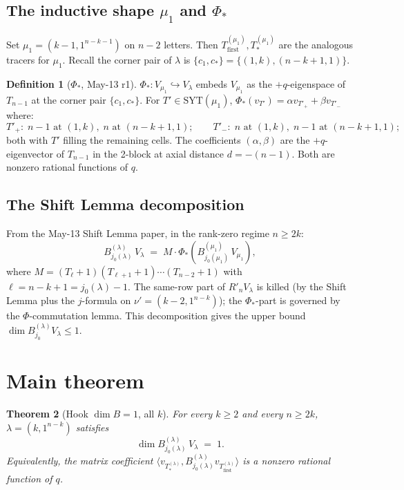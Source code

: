 \documentclass[11pt]{article}
\newtheorem{theorem}{Theorem}
\theoremstyle{definition}
\newtheorem{definition}[theorem]{Definition}
\begin{document}
\subsection{The inductive shape $\mu_1$ and $\Phi_*$}

Set $\mu_1 = (k-1, 1^{n-k-1})$ on $n-2$ letters.  Then
$T_{\mathrm{first}}^{(\mu_1)}, T_{*}^{(\mu_1)}$ are the analogous tracers
for $\mu_1$.  Recall the corner pair of $\lambda$ is
$\{c_1, c_*\} = \{(1, k), (n-k+1, 1)\}$.

\begin{definition}[$\Phi_*$, May-13 r1]\label{def:phi}
$\Phi_* : V_{\mu_1} \hookrightarrow V_\lambda$ embeds $V_{\mu_1}$ as the
$+q$-eigenspace of $T_{n-1}$ at the corner pair $\{c_1, c_*\}$.  For
$T' \in \mathrm{SYT}(\mu_1)$, $\Phi_*(v_{T'}) = \alpha v_{T'_+} + \beta v_{T'_-}$
where:
\[
    T'_+ : \; n{-}1 \text{ at } (1,k), \; n \text{ at } (n{-}k{+}1, 1);
    \qquad
    T'_- : \; n \text{ at } (1,k), \; n{-}1 \text{ at } (n{-}k{+}1, 1);
\]
both with $T'$ filling the remaining cells.  The coefficients
$(\alpha, \beta)$ are the $+q$-eigenvector of $T_{n-1}$ in the 2-block
at axial distance $d = -(n-1)$.  Both are nonzero rational functions
of $q$.
\end{definition}

\subsection{The Shift Lemma decomposition}

From the May-13 Shift Lemma paper, in the rank-zero regime $n \ge 2k$:
\begin{equation}\label{eq:shift-decomp}
    B^{(\lambda)}_{j_0(\lambda)}\,V_\lambda
    \;=\;
    M \cdot \Phi_*\!\left(B^{(\mu_1)}_{j_0(\mu_1)}\,V_{\mu_1}\right),
\end{equation}
where $M = (T_\ell{+}1)(T_{\ell+1}{+}1)\cdots(T_{n-2}{+}1)$ with
$\ell = n-k+1 = j_0(\lambda) - 1$.  The same-row part of
$R'_n V_\lambda$ is killed (by the Shift Lemma plus the $j$-formula on
$\nu' = (k-2, 1^{n-k})$); the $\Phi_*$-part is governed by the
$\Phi$-commutation lemma.  This decomposition gives the upper bound
$\dim B^{(\lambda)}_{j_0} V_\lambda \le 1$.

\section{Main theorem}\label{sec:main}

\begin{theorem}[Hook $\dim B = 1$, all $k$]\label{thm:main}
For every $k \ge 2$ and every $n \ge 2k$, $\lambda = (k, 1^{n-k})$
satisfies
\[
    \dim B^{(\lambda)}_{j_0(\lambda)}\,V_\lambda \;=\; 1.
\]
Equivalently, the matrix coefficient
$\langle v_{T_{*}^{(\lambda)}}, B^{(\lambda)}_{j_0(\lambda)} v_{T_{\mathrm{first}}^{(\lambda)}}\rangle$
is a nonzero rational function of $q$.
\end{theorem}
\end{document}
